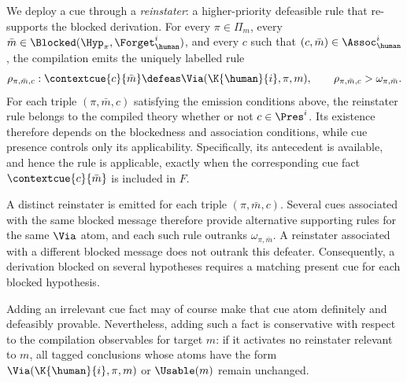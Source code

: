 We deploy a cue through a \emph{reinstater}: a higher-priority defeasible rule that re-supports the blocked derivation. For every $\pi\in\Pi_m$, every $\bar m\in\Blocked(\Hyp_\pi,\Forget_{\human}^{i})$, and every $c$ such that $(c,\bar m)\in\Assoc_{\human}^{i}$, the compilation emits the uniquely labelled rule
\[
  \rho_{\pi,\bar m,c}: \contextcue{c}{\bar m}  \defeas \Via(\K{\human}{i},\pi,m), \qquad   \rho_{\pi,\bar m,c}>\omega_{\pi,\bar m}.
\]
For each triple $(\pi,\bar m,c)$ satisfying the emission conditions above, the reinstater rule belongs to the compiled theory whether or not $c\in\Pres^{i}$. Its existence therefore depends on the blockedness and association conditions, while cue presence controls only its applicability. Specifically, its antecedent is available, and hence the rule is applicable, exactly when the corresponding cue fact $\contextcue{c}{\bar m}$ is included in $F$.

A distinct reinstater is emitted for each triple $(\pi,\bar m,c)$. Several cues associated with the same blocked message therefore provide alternative supporting rules for the same $\Via$ atom, and each such rule outranks $\omega_{\pi,\bar m}$. A reinstater associated with a different blocked message does not outrank this defeater. Consequently, a derivation blocked on several hypotheses requires a matching present cue for each blocked hypothesis.

Adding an irrelevant cue fact may of course make that cue atom definitely and defeasibly provable. Nevertheless, adding such a fact is conservative with respect to the compilation observables for target $m$: if it activates no reinstater relevant to $m$, all tagged conclusions whose atoms have the form $\Via(\K{\human}{i}, \pi,m)$ or $\Usable(m)$ remain unchanged.

